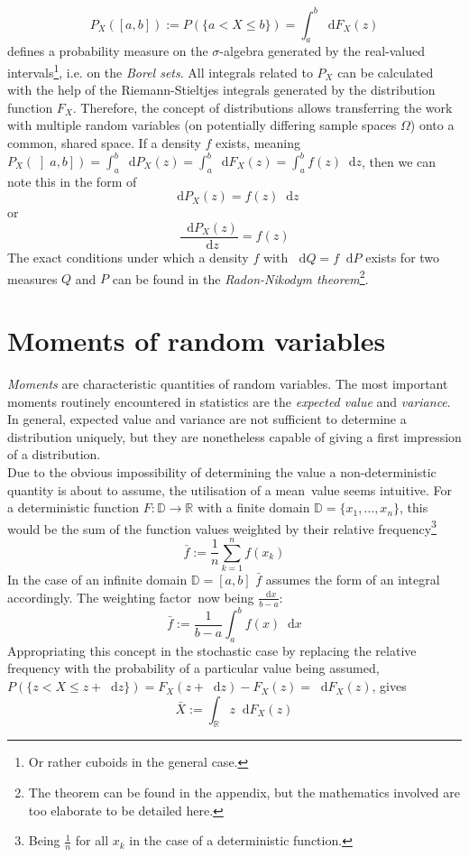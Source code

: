 \documentclass[12pt]{article}
\newcommand*\diff{\mathop{}\!\mathrm{d}}
\begin{document}
\[
P_X(\left[ a, b\right]) := P(\{a < X \leq b\}) = \int_a^b \diff F_X (z)
\]
defines a probability measure on the $\sigma$-algebra generated by the real-valued intervals\footnote{Or rather cuboids in the general case.}, i.e. on the \textit{Borel sets}. All integrals related to $P_X$ can be calculated with the help of the Riemann-Stieltjes integrals generated by the distribution function $F_X$. Therefore, the concept of distributions allows transferring the work with multiple random variables (on potentially differing sample spaces $\Omega$) onto a common, shared space. If a density $f$ exists, meaning $P_X(\left] a, b\right]) = \int_a^b \diff P_X(z)= \int_a^b \diff F_X(z) = \int_a^b f (z)\diff z$, then we can note this in the form of
\[
\diff P_X (z) = f (z) \diff z
\]
or
\[
\frac{\diff P_X(z)}{\diff z} = f (z)
\]
The exact conditions under which a density $f$ with $\diff Q = f \diff P$ exists for two measures $Q$ and $P$ can be found in the \textit{Radon-Nikodym theorem}\footnote{The theorem can be found in the appendix, but the mathematics involved are too elaborate to be detailed here.}.

\section{Moments of random variables}
\textit{Moments} are characteristic quantities of random variables. The most important moments routinely encountered in statistics are the \textit{expected value} and \textit{variance}. In general, expected value and variance are not sufficient to determine a distribution uniquely, but they are nonetheless capable of giving a first impression of a distribution.\\
Due to the obvious impossibility of determining the value a non-deterministic quantity is about to assume, the utilisation of a \glqq mean\grqq \ value seems intuitive.
For a deterministic function $F: \mathbb{D} \to \mathbb{R}$ with a finite domain $\mathbb{D} = \{ x_1, \dots , x_n\}$, this would be the sum of the function values weighted by their relative frequency\footnote{Being $\frac{1}{n}$ for all $x_k$ in the case of a deterministic function.}
\[
\bar{f}:= \frac{1}{n} \sum_{k = 1}^{n}f(x_k)
\]
In the case of an infinite domain $\mathbb{D} = \left[ a, b \right]$ $\bar{f}$ assumes the form of an integral accordingly. The weighting \glqq factor\grqq \ now being $\frac{\diff x}{b - a}$:
\[
\bar{f} := \frac{1}{b - a} \int_a^b f(x) \diff x
\]
Appropriating this concept in the stochastic case by replacing the relative frequency with the probability of a particular value being assumed, $P(\{z < X \leq z + \diff z\}) = F_X(z + \diff z) - F_X (z) = \diff F_X(z)$, gives
\[
\bar{X} := \int_\mathbb{R} z \diff F_X(z)
\]
\end{document}

